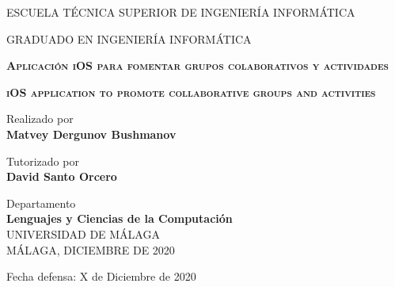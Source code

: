 \begin{titlepage}
    \selectfont
    
    \begin{center}
        {\large ESCUELA TÉCNICA SUPERIOR DE INGENIERÍA INFORMÁTICA}

        \vspace{0.1cm}
        {\large GRADUADO EN INGENIERÍA INFORMÁTICA}

        \vspace{2cm}
        \Large
        \textbf{\textsc{Aplicación iOS para fomentar grupos colaborativos y actividades}}
        \vspace{1cm}
        
        \Large
        \textbf{\textsc{iOS application to promote collaborative groups and activities}}

        \vspace{2cm}
        \large
        Realizado por\\
        \textbf{Matvey Dergunov Bushmanov}

        \vspace{1cm}
        \large
        Tutorizado por\\
        \textbf{David Santo Orcero}

        \vspace{1cm}
        \large
        Departamento\\
        \textbf{Lenguajes y Ciencias de la Computación}\\

        \vspace{2cm}
        \large
        UNIVERSIDAD DE MÁLAGA
        \\
        MÁLAGA, DICIEMBRE DE 2020
    \end{center}
    \begin{flushright}
        \vspace{1.5cm}
        Fecha defensa: X de Diciembre de 2020
    \end{flushright}
\end{titlepage}

\begingroup
    \pagestyle{empty}
    \cleardoublepage
\endgroup
